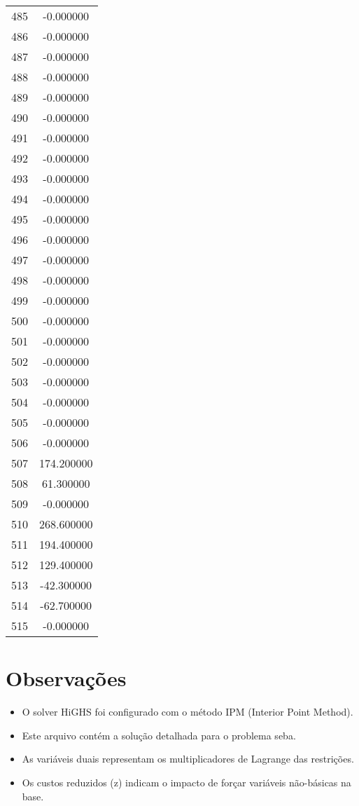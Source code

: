 \documentclass[12pt]{article}
\begin{document}
\begin{longtable}{@{}cc@{}}
485 & -0.000000 \\
486 & -0.000000 \\
487 & -0.000000 \\
488 & -0.000000 \\
489 & -0.000000 \\
490 & -0.000000 \\
491 & -0.000000 \\
492 & -0.000000 \\
493 & -0.000000 \\
494 & -0.000000 \\
495 & -0.000000 \\
496 & -0.000000 \\
497 & -0.000000 \\
498 & -0.000000 \\
499 & -0.000000 \\
500 & -0.000000 \\
501 & -0.000000 \\
502 & -0.000000 \\
503 & -0.000000 \\
504 & -0.000000 \\
505 & -0.000000 \\
506 & -0.000000 \\
507 & 174.200000 \\
508 & 61.300000 \\
509 & -0.000000 \\
510 & 268.600000 \\
511 & 194.400000 \\
512 & 129.400000 \\
513 & -42.300000 \\
514 & -62.700000 \\
515 & -0.000000 \\

\end{longtable}


\section{Observações}

\begin{itemize}
\item O solver HiGHS foi configurado com o método IPM (Interior Point Method).
\item Este arquivo contém a solução detalhada para o problema seba.
\item As variáveis duais representam os multiplicadores de Lagrange das restrições.
\item Os custos reduzidos (z) indicam o impacto de forçar variáveis não-básicas na base.
\end{itemize}
\end{document}
